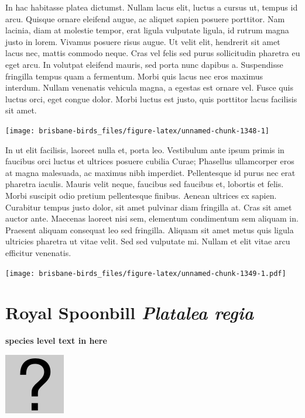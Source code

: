 \documentclass[]{book}
\let\origfigure\figure
\let\endorigfigure\endfigure
\renewenvironment{figure}[1][2] {
  \expandafter\origfigure\expandafter[H]
} {
  \endorigfigure
}
\begin{document}
In hac habitasse platea dictumst. Nullam lacus elit, luctus a cursus ut,
tempus id arcu. Quisque ornare eleifend augue, ac aliquet sapien posuere
porttitor. Nam lacinia, diam at molestie tempor, erat ligula vulputate
ligula, id rutrum magna justo in lorem. Vivamus posuere risus augue. Ut
velit elit, hendrerit sit amet lacus nec, mattis commodo neque. Cras vel
felis sed purus sollicitudin pharetra eu eget arcu. In volutpat eleifend
mauris, sed porta nunc dapibus a. Suspendisse fringilla tempus quam a
fermentum. Morbi quis lacus nec eros maximus interdum. Nullam venenatis
vehicula magna, a egestas est ornare vel. Fusce quis luctus orci, eget
congue dolor. Morbi luctus est justo, quis porttitor lacus facilisis sit
amet.

\begin{figure}
\texttt{[image: brisbane-birds\_files/figure-latex/unnamed-chunk-1348-1]} \caption{insert figure caption}\label{fig:unnamed-chunk-1348}
\end{figure}

In ut elit facilisis, laoreet nulla et, porta leo. Vestibulum ante ipsum
primis in faucibus orci luctus et ultrices posuere cubilia Curae;
Phasellus ullamcorper eros at magna malesuada, ac maximus nibh
imperdiet. Pellentesque id purus nec erat pharetra iaculis. Mauris velit
neque, faucibus sed faucibus et, lobortis et felis. Morbi suscipit odio
pretium pellentesque finibus. Aenean ultrices ex sapien. Curabitur
tempus justo dolor, sit amet pulvinar diam fringilla at. Cras sit amet
auctor ante. Maecenas laoreet nisi sem, elementum condimentum sem
aliquam in. Praesent aliquam consequat leo sed fringilla. Aliquam sit
amet metus quis ligula ultricies pharetra ut vitae velit. Sed sed
vulputate mi. Nullam et elit vitae arcu efficitur venenatis.

\begin{figure}
\centering
\texttt{[image: brisbane-birds\_files/figure-latex/unnamed-chunk-1349-1.pdf]}
\caption{\label{fig:unnamed-chunk-1349}insert figure caption}
\end{figure}

\section{\texorpdfstring{Royal Spoonbill \emph{Platalea
regia}}{Royal Spoonbill Platalea regia}}\label{royal-spoonbill-platalea-regia}

\textbf{species level text in here}

\begin{figure}
\centering
\includegraphics{assets/missing.png}
\caption{No image for species}
\end{figure}
\end{document}
